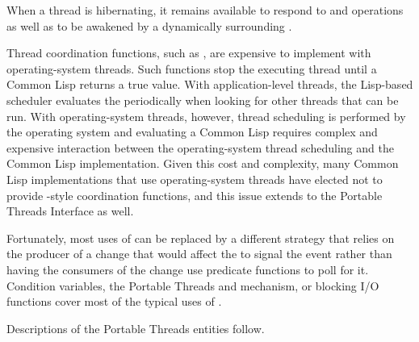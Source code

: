 \documentclass[10pt,twoside,english,pdftex]{article}
\begin{document}
When a thread is hibernating, it remains available to respond to  and  operations as well as to be awakened by a dynamically surrounding .


Thread coordination functions, such as , are
expensive to implement with operating-system threads.  Such functions stop the
executing thread until a Common Lisp  returns a true
value.  With application-level threads, the Lisp-based scheduler evaluates the
 periodically when looking for other threads that
can be run.  With operating-system threads, however, thread scheduling is
performed by the operating system and evaluating a Common Lisp
 requires complex and expensive interaction between
the operating-system thread scheduling and the Common Lisp implementation.
Given this cost and complexity, many Common Lisp implementations that use
operating-system threads have elected not to provide
-style coordination functions, and this issue
extends to the Portable Threads Interface as well.

Fortunately, most uses of  can be replaced by a
different strategy that relies on the producer of a change that would affect
the   to signal the event
rather than having the consumers of the change use predicate functions to poll
for it.  Condition variables, the Portable Threads
 and
 mechanism, or blocking I/O functions
cover most of the typical uses of .

\W\entities
\T{}
\T Descriptions of the Portable Threads entities follow.
\T\clearpage

\end{document}
